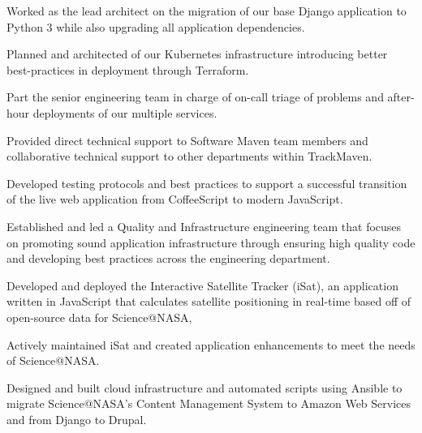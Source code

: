 \documentclass{bluefin_cv}
\begin{document}
\begin{bfcvlist}
    \item Worked as the lead architect on the migration of our base Django application to Python 3 while also upgrading all application dependencies.
    \item Planned and architected of our Kubernetes infrastructure introducing better best-practices in deployment through Terraform.
    \item Part the senior engineering team in charge of on-call triage of problems and after-hour deployments of our multiple services.
    \item Provided direct technical support to Software Maven team members and collaborative technical support to other departments within TrackMaven.
\end{bfcvlist}

\begin{bfcvlist}
    \item Developed testing protocols and best practices to support a successful transition of the live web application from CoffeeScript to modern JavaScript.
    \item Established and led a Quality and Infrastructure engineering team that focuses on promoting sound application infrastructure through ensuring high quality code and developing best practices across the engineering department.
\end{bfcvlist}

\begin{bfcvlist}
    \item Developed and deployed the Interactive Satellite Tracker (iSat), an application written in JavaScript that calculates satellite positioning in real-time based off of open-source data for Science@NASA,
    \item Actively maintained iSat and created application enhancements to meet the needs of Science@NASA.
    \item Designed and built cloud infrastructure and automated scripts using Ansible to migrate Science@NASA’s Content Management System to Amazon Web Services and from Django to Drupal.
\end{bfcvlist}
\end{document}
